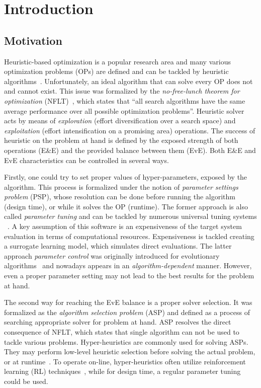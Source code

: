 \chapter{Introduction}\label{intro}

\section{Motivation}
Heuristic-based optimization is a popular research area and many various optimization problems (OPs) are defined and can be tackled by heuristic algorithms~\cite{junger2003combinatorial,biegler2004retrospective,festa2014brief}. Unfortunately, an ideal algorithm that can solve every OP does not and cannot exist. This issue was formalized by the \emph{no-free-lunch theorem for optimization} (NFLT)~\cite{wolpert1997no}, which states that ``all search algorithms have the same average performance over all possible optimization problems''. Heuristic solver acts by means of \emph{exploration} (effort diversification over a search space) and \emph{exploitation} (effort intensification on a promising area) operations. The success of heuristic on the problem at hand is defined by the exposed strength of both operations (E\&E) and the provided balance between them (EvE). Both E\&E and EvE characteristics can be controlled in several ways.

Firstly, one could try to set proper values of hyper-parameters, exposed by the algorithm. This process is formalized under the notion of \emph{parameter settings problem} (PSP), whose resolution can be done before running the algorithm (design time), or while it solves the OP (runtime). The former approach is also called \emph{parameter tuning} and can be tackled by numerous universal tuning systems ~\cite{hutter2009paramils,hutter2011sequential,lopez2016irace,falkner2018bohb,brise2spl}. A key assumption of this software is an expensiveness of the target system evaluation in terms of computational resources. Expensiveness is tackled creating a surrogate learning model, which simulates direct evaluations. The latter approach \emph{parameter control} was originally introduced for evolutionary algorithms~\cite{karafotias2014parameter} and nowadays appears in an \emph{algorithm-dependent} manner. However, even a proper parameter setting may not lead to the best results for the problem at hand. 

The second way for reaching the EvE balance is a proper solver selection. It was formalized as the \emph{algorithm selection problem} (ASP) and defined as a process of searching appropriate solver for problem at hand. ASP resolves the direct consequence of NFLT, which states that single algorithm can not be used to tackle various problems. Hyper-heuristics are commonly used for solving ASPs. They may perform low-level heuristic selection before solving the actual problem, or at runtime~\cite{burke2019classification}. To operate on-line, hyper-heuristics often utilize reinforcement learning (RL) techniques~\cite{moriarty1999evolutionary,mcclymont2011markov}, while for design time, a regular parameter tuning could be used.

